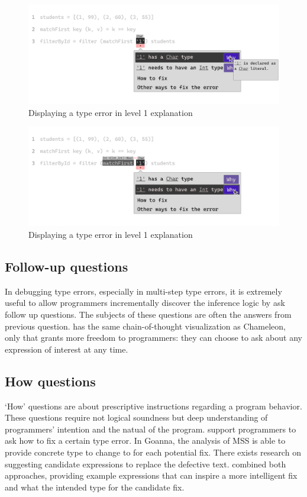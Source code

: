 \begin{figure}[hbt]
  \includegraphics[width=\linewidth]{ExplainError1.pdf}
  \caption{
      Displaying a type error in level 1 explanation
    }
\end{figure}


\begin{figure}[hbt]
  \includegraphics[width=\linewidth]{ExplainError2.pdf}
  \caption{
      Displaying a type error in level 1 explanation
    }
\end{figure}

\subsection{Follow-up questions}
In debugging type errors, especially in multi-step type errors, it is extremely useful to allow programmers incrementally discover the inference logic by ask follow up questions. The subjects of these questions are often the answers from previous question. \toolname{} has the same chain-of-thought visualization as Chameleon, only that \toolname{} grants more freedom to programmers: they can choose to ask about any expression of interest at any time.

\subsection{How questions}
`How' questions are about prescriptive instructions regarding a program behavior. These questions require not logical soundness but deep understanding of programmers' intention and the natual of the program. \toolname support programmers to ask how to fix a certain type error. In Goanna, the analysis of MSS is able to provide concrete type to change to for each potential fix. There exists research \cite{Lerner2007-mu} on suggesting candidate expressions to replace the defective text.  \toolname{} combined both approaches, providing  
example expressions that can inspire a more intelligent fix and what the intended type for the candidate fix. 

